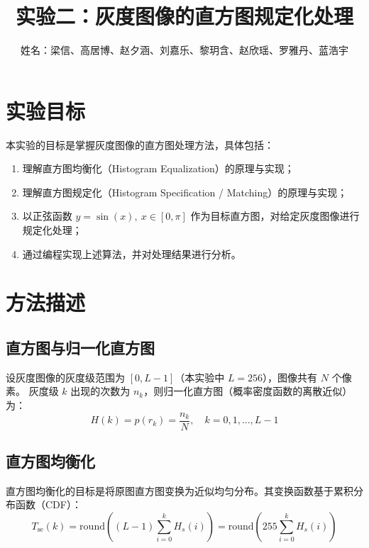 \documentclass[a4paper,zihao=5]{ctexart}
\title{\LARGE\textbf{实验二：灰度图像的直方图规定化处理}}
\author{姓名：梁信、高居博、赵夕涵、刘嘉乐、黎玥含、赵欣瑶、罗雅丹、蓝浩宇}
\date{}
\begin{document}
\maketitle

\section{实验目标}

本实验的目标是掌握灰度图像的直方图处理方法，具体包括：

\begin{enumerate}[itemsep=2pt]
  \item 理解直方图均衡化（Histogram Equalization）的原理与实现；
  \item 理解直方图规定化（Histogram Specification / Matching）的原理与实现；
  \item 以正弦函数 $y = \sin(x),\ x\in[0,\pi]$ 作为目标直方图，对给定灰度图像进行规定化处理；
  \item 通过编程实现上述算法，并对处理结果进行分析。
\end{enumerate}

\section{方法描述}

\subsection{直方图与归一化直方图}

设灰度图像的灰度级范围为 $[0, L-1]$（本实验中 $L=256$），图像共有 $N$ 个像素。
灰度级 $k$ 出现的次数为 $n_k$，则归一化直方图（概率密度函数的离散近似）为：
\begin{equation}
  H(k) = p(r_k) = \frac{n_k}{N}, \quad k = 0, 1, \ldots, L-1
\end{equation}

\subsection{直方图均衡化}

直方图均衡化的目标是将原图直方图变换为近似均匀分布。其变换函数基于累积分布函数（CDF）：
\begin{equation}
  T_{\mathrm{se}}(k) = \mathrm{round}\!\left( (L-1) \sum_{i=0}^{k} H_s(i) \right)
  = \mathrm{round}\!\left( 255 \sum_{i=0}^{k} H_s(i) \right)
\end{equation}
\end{document}
